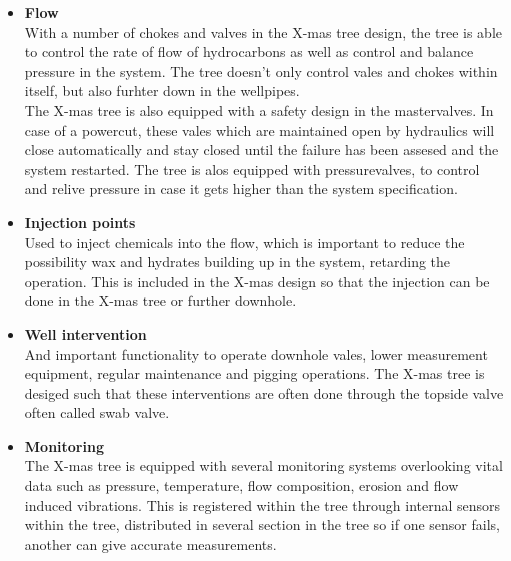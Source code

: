 \documentclass[a4paper,norsk]{article}
\begin{document}
\begin{itemize}
\item \textbf{Flow} \\
With a number of chokes and valves in the X-mas tree design, the tree is able to control the rate of flow of hydrocarbons as well as control and balance pressure in the system. The tree doesn't only control vales and chokes within itself, but also furhter down in the wellpipes. \\The X-mas tree is also equipped with a safety design in the mastervalves. In case of a powercut, these vales which are maintained open by hydraulics will close automatically and stay closed until the failure has been assesed and the system restarted. The tree is alos equipped with pressurevalves, to control and relive pressure in case it gets higher than the system specification.

\item \textbf{Injection points} \\
Used to inject chemicals into the flow, which is important to reduce the possibility wax and hydrates building up in the system, retarding the operation. This is included in the X-mas design so that the injection can be done in the X-mas tree or further downhole.

\item \textbf{Well intervention} \\
And important functionality to operate downhole vales, lower measurement equipment, regular maintenance and pigging operations. The X-mas tree is desiged such that these interventions are often done through the topside valve often called swab valve. 
\item \textbf{Monitoring} \\
The X-mas tree is equipped with several monitoring systems overlooking vital data such as pressure, temperature, flow composition, erosion and flow induced vibrations. This is registered within the tree through internal sensors within the tree, distributed in several section in the tree so if one sensor fails, another can give accurate measurements.
\end{itemize}
\end{document}
